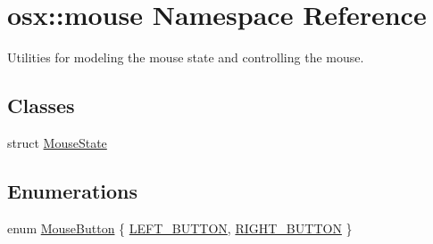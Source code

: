 \hypertarget{namespaceosx_1_1mouse}{\section{osx\-:\-:mouse Namespace Reference}
\label{namespaceosx_1_1mouse}
}


Utilities for modeling the mouse state and controlling the mouse.  


\subsection*{Classes}
\begin{DoxyCompactItemize}
\item 
struct \hyperlink{structosx_1_1mouse_1_1_mouse_state}{Mouse\-State}
\end{DoxyCompactItemize}
\subsection*{Enumerations}
\begin{DoxyCompactItemize}
\item 
enum \hyperlink{namespaceosx_1_1mouse_a025e93cf6af5808e4c8c2525fc668499}{Mouse\-Button} \{ \hyperlink{namespaceosx_1_1mouse_a025e93cf6af5808e4c8c2525fc668499aba5b540b1c997fb283ad354d66d6b5c8}{L\-E\-F\-T\-\_\-\-B\-U\-T\-T\-O\-N}, 
\hyperlink{namespaceosx_1_1mouse_a025e93cf6af5808e4c8c2525fc668499a8f8087d9c68a22fe0ab65e0995e6649b}{R\-I\-G\-H\-T\-\_\-\-B\-U\-T\-T\-O\-N}
 \}
\end{DoxyCompactItemize}
